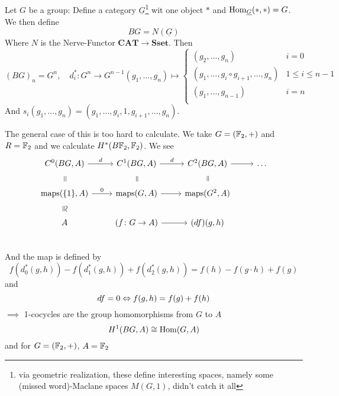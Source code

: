 \documentclass[language=english]{TemplateLecture}
\begin{document}
\begin{example}
    Let \(G\) be a group: Define a category \(\underline{G}\)\footnote{via geometric realization, these define interesting spaces, namely some (missed word)-Maclane spaces \(M(G,1)\), didn't catch it all} wit one object \(*\) and \(\operatorname{Hom}_{\underline{G}}(*,*) = G\). We then define
    \[BG = N(\underline{G})\]
    Where \(N\) is the Nerve-Functor \(\mathbf{CAT} \to \mathbf{Sset}\).
    Then
    \[(BG)_n = G^n, \quad d_i^*\colon G^n \to G^{n-1} (g_1, \dots, g_n) \mapsto \begin{cases}
        (g_2, \dots, g_n) & i = 0 \\
        (g_1, \dots, g_i \circ g_{i+1}, \dots, g_n) & 1 \leq i \leq n-1 \\
        (g_1, \dots , g_{n-1}) & i = n \\
    \end{cases}\]
    And \(s_i(g_1, \dots, g_n) = (g_1, \dots, g_i, 1, g_{i+1}, \dots, g_n)\).

    The general case of this is too hard to calculate. We take \(G = (\mathbb{F}_2, +)\) and \(R = \mathbb{F}_2\) and we calculate \(H^*(B\mathbb{F}_2, \mathbb{F}_2)\).
    We see
    \[\begin{tikzcd}
        {C^0(BG,A)} \ar[r, "d"] \ar[d, phantom, sloped, "= "] & C^1(BG,A) \ar[r, "d"] \ar[d, phantom, sloped, "="] & C^2(BG,A) \ar[r] \ar[d, phantom, sloped, "="] & \dots \\
        \mathrm{maps}(\{1\},A) \ar[r, "0"] \ar[d, sloped, phantom, "\cong"] & \mathrm{maps}(G,A) \ar[r] & \mathrm{maps}(G^2,A) & \\
        A &(f\colon G \to A) \ar[r]&(df)(g,h) & \\
    \end{tikzcd}\]
    And the map is defined by
    \[f(d_0^*(g,h)) - f(d_1^*(g,h)) + f(d_2^*(g,h)) = f(h) - f(g\cdot h) + f(g)\]
    and 
    \[df = 0 \Leftrightarrow f(g,h) = f(g) + f(h)\]
    \(\implies\) 1-cocycles are the group homomorphisms from \(G\) to \(A\)
    \[H^1(BG,A) \cong \operatorname{Hom}(G,A)\]
    and  for \(G = (\mathbb{F}_2, +)\), \(A = \mathbb{F}_2\)
    

\end{example}
\end{document}
